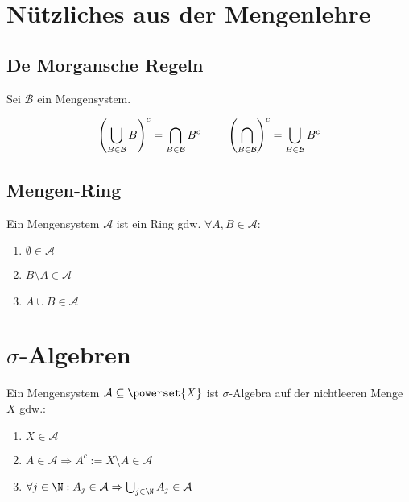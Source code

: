 \newcommand{\A}{\mathcal{A}}
\newcommand{\B}{\mathcal{B}}
\newcommand{\C}{\mathcal{C}}
\newcommand{\E}{\mathcal{E}}
\newcommand{\F}{\mathcal{F}}
\newcommand{\J}{\mathcal{J}}
\renewcommand{\L}{\mathcal{L}}

\newcommand{\1}{\mathbbm{1}}

\section*{Nützliches aus der Mengenlehre}

\subsection*{De Morgansche Regeln}

Sei $\B$ ein Mengensystem.

$$\left(\bigcup_{B\in \B} B \right)^c = \bigcap_{B\in \B} B^c \hspace*{8mm} \left(\bigcap_{B\in \B} \right)^c = \bigcup_{B\in \B} B^c$$

\subsection*{Mengen-Ring}

Ein Mengensystem $\A$ ist ein Ring gdw. $\forall A, B \in \A$:

\begin{enumerate}[label=(\alph*)]
	\item $\emptyset \in \A$
	\item $B\setminus A \in \A$
	\item $A \cup B \in \A$
\end{enumerate}

\section*{$\sigma$-Algebren}

Ein Mengensystem $\A \subseteq \powerset{X}$ ist $\sigma$-Algebra auf der nichtleeren Menge $X$ gdw.:

\begin{enumerate}[label=(\alph*)]
	\item $X \in \A$
	\item $A \in \A \Rightarrow A^c := X\setminus A \in \A$
	\item $\forall j \in \N : A_j \in \A \Rightarrow \bigcup_{j\in \N} A_j \in \A$
\end{enumerate}

